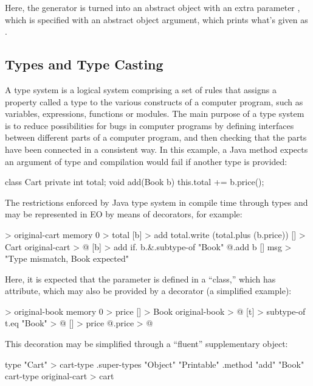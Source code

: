 \documentclass[sigplan,11pt,nonacm,natbib=false]{acmart}
\begin{document}
Here, the generator is turned into an abstract object  with an extra parameter , which is specified with an abstract object argument, which prints what's given as .

\subsection{Types and Type Casting}
\label{sec:types}

A type system is a logical system comprising a set of rules that assigns a property called a type to the various constructs of a computer program, such as variables, expressions, functions or modules. The main purpose of a type system is to reduce possibilities for bugs in computer programs by defining interfaces between different parts of a computer program, and then checking that the parts have been connected in a consistent way. In this example, a Java method  expects an argument of type  and compilation would fail if another type is provided:

\begin{ffcode}
class Cart {
  private int total;
  void add(Book b) {
    this.total += b.price();
  }
}
\end{ffcode}

The restrictions enforced by Java type system in compile time through types  and  may be represented in EO by means of decorators, for example:

\begin{ffcode}
[] > original-cart
  memory 0 > total
  [b] > add
    total.write (total.plus (b.price))
[] > Cart
  original-cart > @
  [b] > add
    if.
      b.&.subtype-of "Book"
      @.add b
      []
        msg > "Type mismatch, Book expected"
\end{ffcode}

Here, it is expected that the parameter  is defined in a ``class,'' which has  attribute, which may also be provided by a decorator (a simplified example):

\begin{ffcode}
[] > original-book
  memory 0 > price
[] > Book
  original-book > @
  [t] > subtype-of
    t.eq "Book" > @
  [] > price
    @.price > @
\end{ffcode}

This decoration may be simplified through a ``fluent'' supplementary object:

\begin{ffcode}
type "Cart" > cart-type
.super-types "Object" "Printable"
.method "add" "Book"
cart-type original-cart > cart
\end{ffcode}
\end{document}
